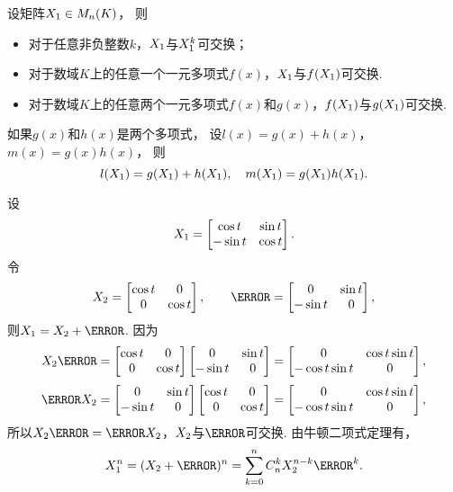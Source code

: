 \begin{theorem}
设矩阵\(X_1 \in M_n(K)\)，
则\begin{itemize}
	\item 对于任意非负整数\(k\)，\(X_1\)与\(X_1^k\)可交换；
	\item 对于数域\(K\)上的任意一个一元多项式\(f(x)\)，\(X_1\)与\(f(X_1)\)可交换.
	\item 对于数域\(K\)上的任意两个一元多项式\(f(x)\)和\(g(x)\)，\(f(X_1)\)与\(g(X_1)\)可交换.
\end{itemize}
\end{theorem}

\begin{theorem}
如果\(g(x)\)和\(h(x)\)是两个多项式，
设\(l(x) = g(x) + h(x)\)，\(m(x) = g(x) h(x)\)，
则\[
	l(X_1) = g(X_1) + h(X_1),
	\quad
	m(X_1) = g(X_1) h(X_1).
\]
\end{theorem}

\begin{example}
设\[
	X_1 = \begin{bmatrix}
	\cos t & \sin t \\
	-\sin t & \cos t
	\end{bmatrix}.
\]
令\[
	\B = \begin{bmatrix}
		\cos t & 0 \\
		0 & \cos t
	\end{bmatrix},
	\qquad
	\C = \begin{bmatrix}
		0 & \sin t \\
		-\sin t & 0
	\end{bmatrix},
\]
则\(\A=\B+\C\).
因为\[
	\B\C = \begin{bmatrix}
		\cos t & 0 \\
		0 & \cos t
	\end{bmatrix}
	\begin{bmatrix}
		0 & \sin t \\
		-\sin t & 0
	\end{bmatrix}
	= \begin{bmatrix}
		0 & \cos t \sin t \\
		-\cos t \sin t & 0
	\end{bmatrix},
\]\[
	\C\B = \begin{bmatrix}
		0 & \sin t \\
		-\sin t & 0
	\end{bmatrix}
	\begin{bmatrix}
		\cos t & 0 \\
		0 & \cos t
	\end{bmatrix}
	= \begin{bmatrix}
		0 & \cos t \sin t \\
		-\cos t \sin t & 0
	\end{bmatrix},
\]
所以\(\B\C=\C\B\)，\(X_2\)与\(\C\)可交换.
由牛顿二项式定理有，\[
	\A^n=(\B+\C)^n
	=\sum_{k=0}^n C_n^k \B^{n-k} \C^k.
\]
\end{example}

